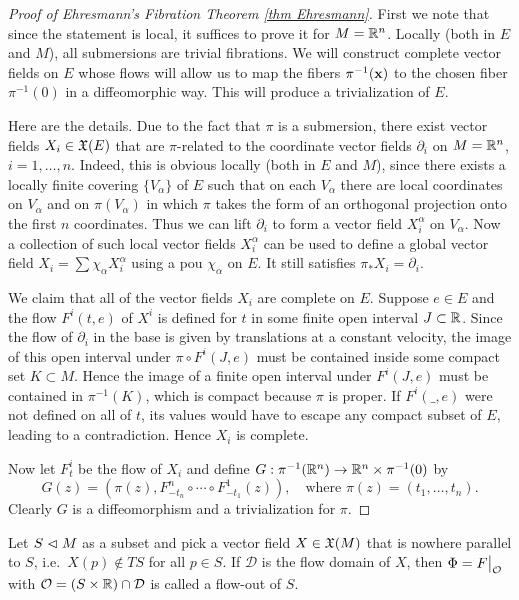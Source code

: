 \begin{proof}[Proof of Ehresmann's Fibration Theorem \ref{thm Ehresmann}]\label{proof of Ehresmann thm}
    First we note that since the statement is local, it suffices to prove it for $M=\bbR^n$. Locally (both in $E$ and $M$), all submersions are trivial fibrations. We will construct complete vector fields on $E$ whose flows will allow us to map the fibers $\pi^{-1}(\bf{x})$ to the chosen fiber $\pi^{-1}(0)$ in a diffeomorphic way. This will produce a  trivialization of $E$.
    
    Here are the details. Due to the fact that $\pi$ is a submersion, there exist vector fields $X_i\in\fX(E)$ that are $\pi$-related to the coordinate vector fields $\partial_i$ on $M=\bbR^n$, $i=1,\ldots,n$. Indeed, this is obvious locally (both in $E$ and $M$), since there exists a locally finite covering $\{V_\alpha\}$ of $E$ such that on each $V_\alpha$ there are local coordinates on $V_\alpha$ and on $\pi(V_\alpha)$ in which $\pi$ takes the form of an orthogonal projection onto the first $n$ coordinates. Thus we can lift $\partial_i$ to form a vector field $X^\alpha_i$ on $V_\alpha$. Now a collection of such local vector fields $X_i^\alpha$ can be used to define a global vector field $X_i=\sum\chi_\alpha X_i^\alpha$ using a \gls{pou} $\chi_\alpha$ on $E$. It still satisfies $\pi_\ast X_i=\partial_i$.

    We claim that all of the vector fields $X_i$ are complete on $E$. Suppose $e\in E$ and the flow $F^i(t,e)$ of $X^i$ is defined for $t$ in some finite open interval $J\subset \bbR$. Since the flow of $\partial_i$ in the base is given by translations at a constant velocity, the image of this open interval under $\pi\circ F^i(J,e)$ must be contained inside some compact set $K\subset M$. Hence the image of a finite open interval under $F^i(J,e)$ must be contained in $\pi^{-1}(K)$, which is compact because $\pi$ is proper. If $F^i(\_,e)$ were not defined on all of $t$, its values would have to escape any compact subset of $E$, leading to a contradiction. Hence $X_i$ is complete.
    
    Now let $F^i_t$ be the flow of $X_i$ and define $G:\pi^{-1}(\bbR^n)\to \bbR^n\times \pi^{-1}(0)$ by 
    \[G(z)=\left(\pi(z),F^n_{-t_n}\circ \cdots\circ F^1_{-t_1}(z)\right),\quad \text{where }\pi(z)=(t_1,\ldots,t_n).\]
    Clearly $G$ is a diffeomorphism and a trivialization for $\pi$.
\end{proof}




\begin{defn}
Let $S\sub M$ as a subset and pick a vector field $X\in\fX(M)$ that is nowhere parallel to $S$, i.e.\ $X(p)\notin TS$ for all $p\in S$. If $\mathcal{D}$ is the flow domain of $X$, then $\Phi=\restr{F}{\mathcal{O}}$ with $\mathcal{O}=(S\times\bbR )\cap \mathcal{D}$ is called a flow-out of $S$.
\end{defn}

